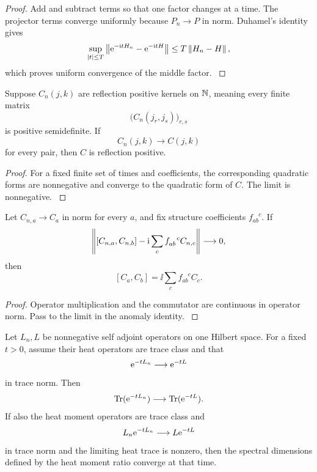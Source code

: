 \begin{proof}\label{strong:proof:076}
Add and subtract terms so that one factor changes at a time. The projector terms converge uniformly because \(P_n\to P\) in norm. Duhamel's identity gives
\[
\sup_{\abs t\leq T}
\norm{\e^{-\ii tH_n}-\e^{-\ii tH}}
\leq
T\norm{H_n-H},
\]
which proves uniform convergence of the middle factor.
\label{strong:proof:076:end}\end{proof}

\begin{theorem}\label{strong:theorem:048}\label{strong:thm:reflection_limit}
Suppose \(C_n(j,k)\) are reflection positive kernels on \(\NN\), meaning every finite matrix
\[
\bigl(C_n(j_r,j_s)\bigr)_{r,s}
\]
is positive semidefinite. If
\[
C_n(j,k)\longrightarrow C(j,k)
\]
for every pair, then \(C\) is reflection positive.
\end{theorem}

\begin{proof}\label{strong:proof:077}
For a fixed finite set of times and coefficients, the corresponding quadratic forms are nonnegative and converge to the quadratic form of \(C\). The limit is nonnegative.
\label{strong:proof:077:end}\end{proof}

\begin{theorem}\label{strong:theorem:049}\label{strong:thm:constraint_limit}
Let \(C_{n,a}\to C_a\) in norm for every \(a\), and fix structure coefficients \(f_{ab}^{\phantom{ab}c}\). If
\[
\norm{
[C_{n,a},C_{n,b}]
-\ii\sum_cf_{ab}^{\phantom{ab}c}C_{n,c}
}
\longrightarrow0,
\]
then
\[
[C_a,C_b]
=\ii\sum_cf_{ab}^{\phantom{ab}c}C_c.
\]
\end{theorem}

\begin{proof}\label{strong:proof:078}
Operator multiplication and the commutator are continuous in operator norm. Pass to the limit in the anomaly identity.
\label{strong:proof:078:end}\end{proof}

\begin{theorem}\label{strong:theorem:050}\label{strong:thm:trace_norm_heat}
Let \(L_n,L\) be nonnegative self adjoint operators on one Hilbert space. For a fixed \(t>0\), assume their heat operators are trace class and that
\[
\e^{-tL_n}\longrightarrow\e^{-tL}
\]
in trace norm. Then
\[
\Tr(\e^{-tL_n})\longrightarrow\Tr(\e^{-tL}).
\]
If also the heat moment operators are trace class and
\[
L_n\e^{-tL_n}\longrightarrow L\e^{-tL}
\]
in trace norm and the limiting heat trace is nonzero, then the spectral dimensions defined by the heat moment ratio converge at that time.
\end{theorem}

